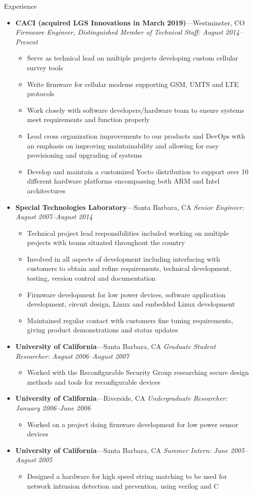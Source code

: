 \documentclass[10pt,oneside]{article}
\newenvironment{ressection}[1]{
  \vspace{-2pt}
  {\fontfamily{cmr}\selectfont\Large#1}
  \begin{itemize}
  \vspace{-1pt}
}{
  \end{itemize}
}
\newcommand{\ressubitem}[1]{
  \vspace{-1pt}
  \item \begin{flushleft} #1 \end{flushleft}
}
\newcommand{\resbigitem}[3]{
  \vspace{-5pt}
  \item
  \textbf{#1}---#2 \hfill \textit{#3}
}
\newenvironment{ressubsec}[3]{
  \resbigitem{#1}{#2}{#3}
  \vspace{-2pt}
  \begin{itemize}
}{
  \end{itemize}
}
\begin{document}
\begin{ressection}{Experience}
  \begin{ressubsec}{CACI (acquired LGS Innovations in March 2019)}{Westminster, CO}{Firmware Engineer, Distinguished Member of Technical Staff: August 2014--Present}
    \ressubitem{Serve as technical lead on multiple projects developing custom cellular survey tools}
    \ressubitem{Write firmware for cellular modems supporting GSM, UMTS and LTE protocols}
    \ressubitem{Work closely with software developers/hardware team to ensure systems meet requirements and function properly}
    \ressubitem{Lead cross organization improvements to our products and DevOps with an emphasis on improving maintainability and allowing for easy provisioning and upgrading of systems}
    \ressubitem{Develop and maintain a customized Yocto distribution to support over 10 different hardware platforms encompassing both ARM and Intel architectures}
  \end{ressubsec}


  \begin{ressubsec}{Special Technologies Laboratory}{Santa Barbara, CA}{Senior Engineer: August 2007--August 2014}
    \ressubitem{Technical project lead responsibilities included working on multiple projects with teams situated
                throughout the country}
    \ressubitem{Involved in all aspects of development including interfacing with customers to obtain and refine
                requirements, technical development, testing, version control and documentation}
    \ressubitem{Firmware development for low power devices, software application development, circuit design, Linux
                and embedded Linux development}
    \ressubitem{Maintained regular contact with customers fine tuning requirements, giving product demonstrations and
                status updates}
  \end{ressubsec}

  \begin{ressubsec}{University of California}{Santa Barbara, CA}{Graduate Student Researcher: August 2006--August 2007}
    \ressubitem{Worked with the Reconfigurable Security Group researching secure design methods and tools for
                reconfigurable devices}
  \end{ressubsec}

  \begin{ressubsec}{University of California}{Riverside, CA}{Undergraduate Researcher: January 2006--June 2006}
    \ressubitem{Worked on a project doing firmware development for low power sensor devices}
  \end{ressubsec}

  \begin{ressubsec}{University of California}{Santa Barbara, CA}{Summer Intern: June 2005--August 2005}
    \ressubitem{Designed a hardware for high speed string matching to be used for network intrusion detection and prevention, using verilog and C}
  \end{ressubsec}

\end{ressection}
\end{document}
